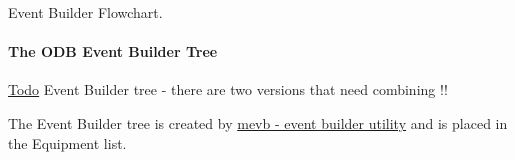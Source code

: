 \begin{center} Event Builder Flowchart.  \end{center} 

\label{FE_Event_Builder_idx_ODB_tree_event-builder}
\hypertarget{FE_Event_Builder_idx_ODB_tree_event-builder}{}




 \hypertarget{FE_Event_Builder_FE_ODB_EBuilder_Tree}{}\paragraph{The ODB Event Builder Tree}\label{FE_Event_Builder_FE_ODB_EBuilder_Tree}
\begin{Desc}
\item[\hyperlink{todo__todo000001}{Todo}]Event Builder tree -\/ there are two versions that need combining !!\end{Desc}
The Event Builder tree is created by \hyperlink{FE_Event_Builder_FE_mevb_utility}{mevb -\/ event builder utility} and is placed in the Equipment list.


